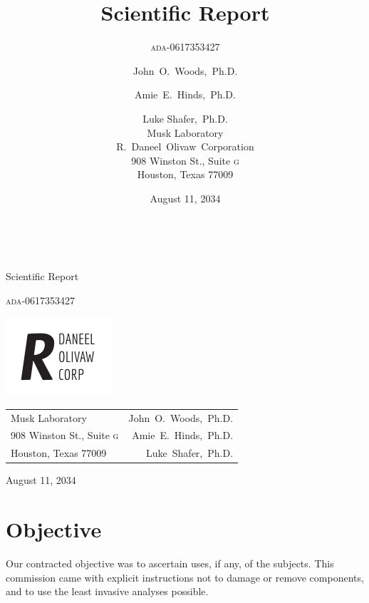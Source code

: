 \documentclass[10pt,twoside,openany]{article}
\title{Scientific Report}
\subtitle{\textsc{ada}-0617353427}
\author{
        John~O.~Woods,~Ph.D. \\
            \and
        Amie~E.~Hinds,~Ph.D. \\
            \and
        Luke Shafer,~Ph.D. \\
        Musk Laboratory\\
        R.~Daneel~Olivaw~Corporation\\
        908 Winston St., Suite \textsc{g} \\
        Houston, Texas 77009
}
\date{August 11, 2034}
\theoremstyle{definition}
\begin{document}
\begin{titlepage}
\centering
\ \par\vspace{1cm}
{\LARGE Scientific Report \par}
{\Large \textsc{ada}-0617353427 \par}
\vfill
\end{titlepage}
\newpage

\hspace*{-0.46in}\vspace*{-0.25in}
\includegraphics[scale=1.5]{r_daneel_olivaw.pdf}
\begin{table}[H]
\begin{tabularx}{1.0\linewidth}{@{}Xr@{}}
	Musk Laboratory & John~O.~Woods,~Ph.D.\\
        908 Winston St., Suite \textsc{g} & Amie~E.~Hinds,~Ph.D.\\
        Houston, Texas 77009 & Luke~Shafer,~Ph.D.\\
\end{tabularx}
\end{table}
\vspace{1em}
\noindent August 11, 2034
\thispagestyle{empty}
\vfill
\newpage




\section{Objective}
Our contracted objective was to ascertain uses, if any, of the subjects.
This commission came with explicit instructions not to damage or remove components, and to use the least invasive analyses possible.
\end{document}
